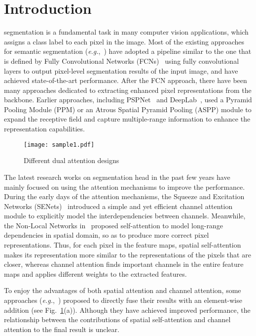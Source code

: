 \documentclass[journal]{IEEEtran}
\begin{document}
\IEEEpeerreviewmaketitle



\section{Introduction}
\label {sIntroduction}



 segmentation is a fundamental task in many computer vision applications, which assigns a class label to each pixel in the image. 
Most of the existing approaches for semantic segmentation (\textit{e.g.},~\cite{cDeepLab,cDeepLabV3,cOCR,cDenseASPP,cDualAttention,cEMANet}) have adopted a pipeline similar to the one that is defined by Fully Convolutional Networks (FCNs)~\cite{cFCN} using fully convolutional layers to output pixel-level segmentation results of the input image, and have achieved state-of-the-art performance. After the FCN approach, there have been many approaches dedicated to extracting enhanced pixel representations from the backbone. 
Earlier approaches, including PSPNet~\cite{cPSPNet} and DeepLab~\cite{cDeepLabV3Plus}, used a Pyramid Pooling Module (PPM) or an Atrous Spatial Pyramid Pooling (ASPP) module to expand the receptive field and capture multiple-range information to enhance the representation capabilities. 

\begin{figure}[t]
	\centering
	\texttt{[image: sample1.pdf]}
	\caption{Different dual attention designs}
\label{fig0}
\end{figure}

The latest research works on segmentation head in the past few years have mainly focused on using the attention mechanisms to improve the performance. 
During the early days of the attention mechanisms, the Squeeze and Excitation Networks (SENets)~\cite{cSENet} introduced a simple and yet efficient channel attention module to explicitly model the interdependencies between channels. 
Meanwhile, the Non-Local Networks in~\cite{cNonLocal} proposed self-attention to model long-range dependencies in spatial domain, so as to produce more correct pixel representations. Thus, for each pixel in the feature maps, spatial self-attention makes its representation more similar to the representations of the pixels that are closer, whereas channel attention finds important channels in the entire feature maps and applies different weights to the extracted features.

To enjoy the advantages of both spatial attention and channel attention, some approaches (\textit{e.g.},~\cite{cDualAttention}) proposed to directly fuse their results with an element-wise addition (see Fig.~\ref{fig0}(a)). 
Although they have achieved improved performance, the relationship between the contributions of spatial self-attention and channel attention to the final result is unclear. 
\end{document}
